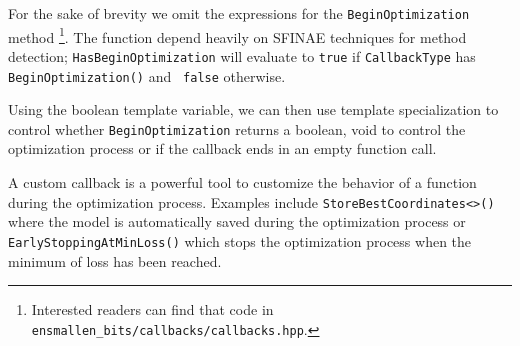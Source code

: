 For the sake of brevity we omit the expressions for the {\tt BeginOptimization}
method \footnote{Interested readers can find that code in {\tt
ensmallen\_bits/callbacks/callbacks.hpp}.}. The function depend heavily on
SFINAE techniques for method detection; {\tt HasBeginOptimization} will evaluate
to {\tt true} if {\tt CallbackType} has {\tt BeginOptimization()} and {\tt
false} otherwise.

Using the boolean template variable, we can then use template specialization to
control whether {\tt BeginOptimization} returns a boolean, void to control the
optimization process or if the callback ends in an empty function
call.











A custom callback is a powerful tool to customize the behavior of a function
during the optimization process. Examples include {\tt StoreBestCoordinates<>()}
where the model is automatically saved during the optimization process or {\tt
EarlyStoppingAtMinLoss()}  which stops the optimization process when the minimum
of loss has been reached.

